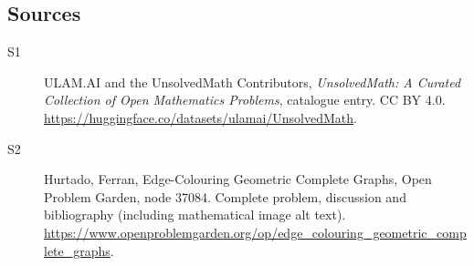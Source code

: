 \documentclass[11pt]{book}
\begin{document}
\subsection{Sources}
\begin{description}
\item[\hypertarget{source:statement:1}{S1}] ULAM.AI and the UnsolvedMath Contributors, \emph{UnsolvedMath: A Curated Collection of Open Mathematics Problems}, catalogue entry. CC BY 4.0. \url{https://huggingface.co/datasets/ulamai/UnsolvedMath}.
\item[\hypertarget{source:statement:2}{S2}] Hurtado, Ferran, Edge-Colouring Geometric Complete Graphs, Open Problem Garden, node 37084. Complete problem, discussion and bibliography (including mathematical image alt text). \url{https://www.openproblemgarden.org/op/edge_colouring_geometric_complete_graphs}.
\end{description}
\label{end:statement}
\end{document}
